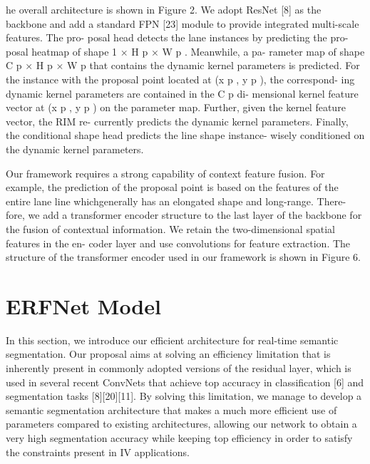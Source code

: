 he overall architecture is shown in Figure 2. We adopt
ResNet [8] as the backbone and add a standard FPN [23]
module to provide integrated multi-scale features. The pro-
posal head detects the lane instances by predicting the pro-
posal heatmap of shape 1 × H p × W p . Meanwhile, a pa-
rameter map of shape C p × H p × W p that contains the
dynamic kernel parameters is predicted. For the instance
with the proposal point located at (x p , y p ), the correspond-
ing dynamic kernel parameters are contained in the C p di-
mensional kernel feature vector at (x p , y p ) on the parameter
map. Further, given the kernel feature vector, the RIM re-
currently predicts the dynamic kernel parameters. Finally,
the conditional shape head predicts the line shape instance-
wisely conditioned on the dynamic kernel parameters.

Our framework requires a strong capability of context
feature fusion. For example, the prediction of the proposal
point is based on the features of the entire lane line whichgenerally has an elongated shape and long-range. There-
fore, we add a transformer encoder structure to the last layer
of the backbone for the fusion of contextual information.
We retain the two-dimensional spatial features in the en-
coder layer and use convolutions for feature extraction. The
structure of the transformer encoder used in our framework
is shown in Figure 6.

\section{ERFNet Model}

In this section, we introduce our efficient architecture for
real-time semantic segmentation. Our proposal aims at solving
an efficiency limitation that is inherently present in commonly
adopted versions of the residual layer, which is used in several
recent ConvNets that achieve top accuracy in classification [6]
and segmentation tasks [8][20][11]. By solving this limitation,
we manage to develop a semantic segmentation architecture
that makes a much more efficient use of parameters compared
to existing architectures, allowing our network to obtain a very
high segmentation accuracy while keeping top efficiency in
order to satisfy the constraints present in IV applications.

